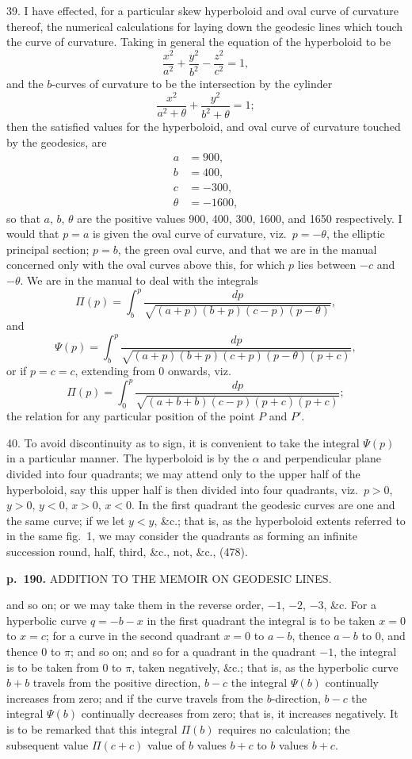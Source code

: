 \documentclass[11pt,a4paper]{article}
\begin{document}
39. I have effected, for a particular skew hyperboloid and oval curve of curvature thereof, the numerical calculations for laying down the geodesic lines which touch the curve of curvature.  Taking in general the equation of the hyperboloid to be
\[
\frac{x^2}{a^2} + \frac{y^2}{b^2} - \frac{z^2}{c^2} = 1,
\]
and the $b$-curves of curvature to be the intersection by the cylinder
\[
\frac{x^2}{a^2 + \theta} + \frac{y^2}{b^2 + \theta} = 1;
\]
then the satisfied values for the hyperboloid, and oval curve of curvature touched by
the geodesics, are
\begin{align*}
a &= 900, \\
b &= 400, \\
c &= -300, \\
\theta &= -1600,
\end{align*}
so that $a$, $b$, $\theta$ are the positive values 900, 400, 300, 1600, and 1650 respectively. I would that $p = a$ is given the oval curve of curvature, viz.\ $p = -\theta$, the elliptic principal section; $p = b$, the green oval curve, and that we are in the manual concerned only with the oval curves above this, for which $p$ lies between $-c$ and $-\theta$. We are in the manual to deal with the integrals
\[
\Pi(p) = \int_b^{p} \frac{dp}{\sqrt{(a + p)(b + p)(c - p)(p - \theta)}},
\]
and
\[
\Psi(p) = \int_b^{p} \frac{dp}{\sqrt{(a + p)(b + p)(c + p)(p - \theta)(p + c)}},
\]
or if $p = c = c$, extending from 0 onwards, viz.
\[
\Pi(p) = \int_0^{p} \frac{dp}{\sqrt{(a + b + b)(c - p)(p + c)(p + c)}};
\]
the relation for any particular position of the point $P$ and $P'$.

40. To avoid discontinuity as to sign, it is convenient to take the integral $\Psi(p)$ in a particular manner.  The hyperboloid is by the $\alpha$ and perpendicular plane divided into four quadrants; we may attend only to the upper half of the hyperboloid, say this upper half is then divided into four quadrants, viz.\ $p > 0$, $y > 0$, $y < 0$, $x > 0$, $x < 0$. In the first quadrant the geodesic curves are one and the same curve; if we let $y < y$, \&c.; that is, as the hyperboloid extents referred to in the same fig.\ 1, we may consider the quadrants as forming an infinite succession round, half, third, \&c., not, \&c., (478).

\clearpage

\noindent
\textbf{p.~190.}  ADDITION TO THE MEMOIR ON GEODESIC LINES.

and so on; or we may take them in the reverse order, $-1$, $-2$, $-3$, \&c. For a hyperbolic curve $q = -b - x$ in the first quadrant the integral is to be taken $x = 0$ to $x = c$;  for a curve in the second quadrant $x = 0$ to $a - b$, thence $a - b$ to $0$, and thence $0$ to $\pi$; and so on; and so for a quadrant in the quadrant $-1$, the integral is to be taken from $0$ to $\pi$, taken negatively, \&c.; that is, as the hyperbolic curve $b + b$ travels from the positive direction, $b - c$ the integral $\Psi(b)$ continually increases from zero; and if the curve travels from the $b$-direction, $b - c$ the integral $\Psi(b)$ continually decreases from zero; that is, it increases negatively.  It is to be remarked that this integral $\Pi(b)$ requires no calculation; the subsequent value $\Pi(c + c)$ value of $b$ values $b + c$ to $b$ values $b + c$.
\end{document}
